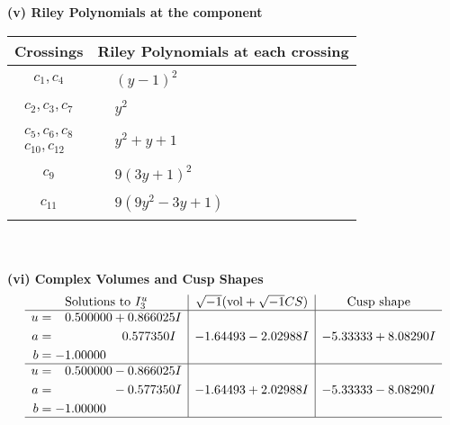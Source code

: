 \documentclass[1p]{elsarticle_modified}
\theoremstyle{definition}
\newcommand{\I}{\sqrt{-1}}
\begin{document}
\newpage\renewcommand{\arraystretch}{1}
\flushleft \textbf{(v) Riley Polynomials at the component}\newline \\
\begin{tabular}{m{50pt}|m{274pt}}
Crossings & \hspace{64pt}Riley Polynomials at each crossing \\
\hline $$\begin{aligned}c_{1},c_{4}\end{aligned}$$&$\begin{aligned}
&(y-1)^2
\end{aligned}$\\
\hline $$\begin{aligned}c_{2},c_{3},c_{7}\end{aligned}$$&$\begin{aligned}
&y^2
\end{aligned}$\\
\hline $$\begin{aligned}c_{5},c_{6},c_{8}\\c_{10},c_{12}\end{aligned}$$&$\begin{aligned}
&y^2+y+1
\end{aligned}$\\
\hline $$\begin{aligned}c_{9}\end{aligned}$$&$\begin{aligned}
&9(3 y+1)^2
\end{aligned}$\\
\hline $$\begin{aligned}c_{11}\end{aligned}$$&$\begin{aligned}
&9(9 y^2-3 y+1)
\end{aligned}$\\
\hline
\end{tabular}\\~\\
\newpage\flushleft \textbf{(vi) Complex Volumes and Cusp Shapes}
$$\begin{array}{c|c|c}  
\text{Solutions to }I^u_{3}& \I (\text{vol} + \sqrt{-1}CS) & \text{Cusp shape}\\
 \hline 
\begin{aligned}
u &= \phantom{-}0.500000 + 0.866025 I \\
a &= \phantom{-0.000000 -}0.577350 I \\
b &= -1.00000\phantom{ +0.000000I}\end{aligned}
 & -1.64493 - 2.02988 I & -5.33333 + 8.08290 I \\ \hline\begin{aligned}
u &= \phantom{-}0.500000 - 0.866025 I \\
a &= \phantom{-0.000000 } -0.577350 I \\
b &= -1.00000\phantom{ +0.000000I}\end{aligned}
 & -1.64493 + 2.02988 I & -5.33333 - 8.08290 I\\
 \hline 
 \end{array}$$\newpage
\end{document}
